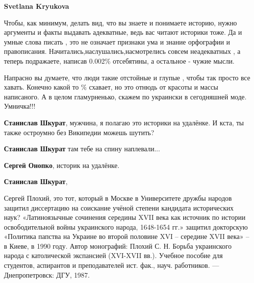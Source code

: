\begin{itemize}
\begin{itemize}
\textbf{Svetlana Kryukova}

Чтобы, как минимум, делать вид, что вы знаете и понимаете историю, нужно
аргументы и факты выдавать адекватные, ведь вас читают историки тоже. Да и
умные слова писать , это не означает признаки ума и знание орфографии и
правописания. Начитались,наслушались,насмотрелись совсем неадекватных , а
теперь подражаете, написав 0.002\% отсебятины, а остальное - чужие мысли.

Напрасно вы думаете, что люди такие отстойные и глупые , чтобы так просто все
хавать. Конечно какой то \% схавает, но это отнюдь от красоты и массы
написаного. А в целом гламурненько, скажем по украински в сегодняшней моде.
Умничка!!!

 
\textbf{Станислав Шкурат}, мужчина, я полагаю это историки на удалёнке. И кста, ты также остроумно без Википедии можешь шутить?

 
\textbf{Станислав Шкурат} там тебе на спину наплевали...

 
\textbf{Сергей Онопко}, историк на удалёнке.

 
\textbf{Станислав Шкурат},

Сергей Плохий, это тот, который в Москве в Университете дружбы народов защитил
диссертацию на соискание учёной степени кандидата исторических наук?
«Латиноязычные сочинения середины XVII века как источник по истории
освободительной войны украинского народа, 1648-1654 гг.» защитил докторскую
«Политика папства на Украине во второй половине XVI – середине XVII века» – в
Киеве, в 1990 году. Автор монографий: Плохий С. Н. Борьба украинского народа с
католической экспансией (XVI-XVII вв.). Учебное пособие для студентов,
аспирантов и преподавателей ист. фак., науч. работников. — Днепропетровск: ДГУ,
1987.


\end{itemize}
\end{itemize}
